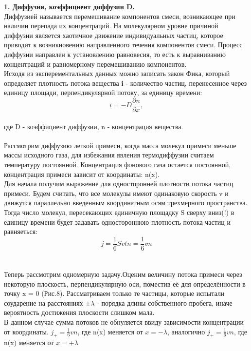 \documentclass[a4paper, fontsize = 14pt]{article}
\begin{document}
\textbf{1. Диффузия, коэффициент диффузии D.}\\
Диффузией называется перемешивание компонентов смеси, возникающее при наличии перепада их концентраций. На молекулярном уровне причиной диффузии является хаотичное движение
индивидуальных частиц, которое приводит к возникновению направленного течения компонентов смеси. Процесс диффузии направлен к установлению равновесия, то есть к выравниванию концентраций и равномерному перемешиванию компонентов.\\

Исходя из эксперементальных данных можно записать закон Фика, который определяет плотность потока вещества \textbf{i} - количество частиц, перенесенное через единицу площади, перпендикулярной потоку, за единицу времени:
\begin{equation}
i = - D\frac{\partial n}{\partial x},
\end{equation}\\
где D - коэффициент диффузии, n - концентрация вещества. \\
\\
Рассмотрим диффузию легкой примеси, когда масса молекул примеси меньше массы исходного газа, для избежания явления термодиффузии считаем температуру постоянной. Концентрация фонового газа остается постоянной, концентрация примеси зависит от координаты: n(x).\\
Для начала получим выражение для односторонней плотности потока частиц примеси. Будем считать, что все молекулы имеют одинаковую скорость v и движутся параллельно введенным координатным осям трехмерного пространства. \\
Тогда число молекул, пересекающих единичную площадку S сверху вниз(!) в единицу времени будет задавать одностороннюю плотность потока частиц и равняеться:
$$j = \frac{1}{6} Svt n = \frac{1}{6}vn$$ \\
\\
Теперь рассмотрим одномерную задачу.Оценим величину потока примеси через некоторую плоскость, перпендикулярную оси, поместив её для определённости в точку x = 0 (Рис.8). Рассматриваем только те частицы, которые испытали соударение на расстояниях $\pm \lambda$ - порядка длины собственного пробега, иначе вероятность достижения плоскости слишком мала.
\\ 
В данном случае сумма потоков не обнуляется ввиду зависимости концентрации от координаты. $j_{+} =\frac{1}{6} v n$, где n(x) меняется от $x = -\lambda$, аналогично $j_{+} = \frac{1}{6} v n$, где n(x) меняется от $x = + \lambda$ \\
\end{document}
